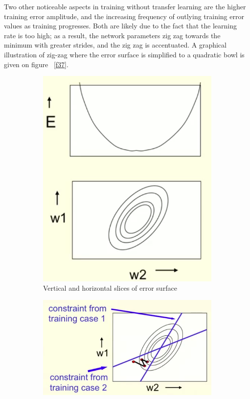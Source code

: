 \documentclass[a4paper,11pt]{article}
\begin{document}
Two other noticeable aspects in training without transfer learning are the higher training error amplitude, and the increasing frequency of outlying training error values as training progresses. Both are likely due to the fact that the learning rate is too high; as a result, the network parameters zig zag towards the minimum with greater strides, and the zig zag is accentuated. A graphical illustration of zig-zag where the error surface is simplified to a quadratic bowl is given on figure ~\ref{f37}. 

\begin{figure}[h!]
	\centering
	\begin{subfigure}{.5\textwidth}
  		\centering
		\includegraphics[scale=0.3]{images/gradient_descent_ellipses.png}
		\caption{Vertical and horizontal slices of error surface}
	\end{subfigure}%
	\begin{subfigure}{.5\textwidth}
  		\centering
		\includegraphics[scale=0.3]{images/gradient_descent_zigzag.png}

\end{subfigure}
\end{figure}
\end{document}
